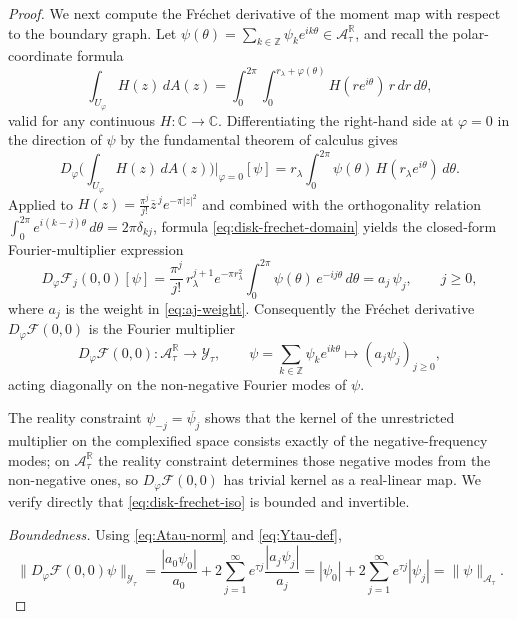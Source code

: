 \documentclass[a4paper,11pt,reqno]{amsart}
\numberwithin{equation}{section}
\theoremstyle{plain} %
\theoremstyle{definition} %
\theoremstyle{remark}
\newcommand{\R}{\mathbb{R}}
\newcommand{\C}{\mathbb{C}}
\newcommand{\Z}{\mathbb{Z}}
\begin{document}
\begin{proof}
We next compute the Fr\'echet derivative of the moment map with respect to
the boundary graph. Let
\(\psi(\theta)=\sum_{k\in\Z}\psi_k e^{ik\theta}\in\mathcal A_\tau^\R\), and
recall the polar-coordinate formula
\[
\int_{U_\varphi}H(z)\,dA(z)
=
\int_0^{2\pi}\!\!\int_0^{r_\lambda+\varphi(\theta)}
H(re^{i\theta})\,r\,dr\,d\theta,
\]
valid for any continuous \(H\colon\C\to\C\). Differentiating the right-hand
side at \(\varphi=0\) in the direction of \(\psi\) by the fundamental
theorem of calculus gives
\begin{equation}\label{eq:disk-frechet-domain}
D_\varphi\!\Big(\int_{U_\varphi}H(z)\,dA(z)\Big)\bigg|_{\varphi=0}\![\psi]
=
r_\lambda\!\int_0^{2\pi}\!\psi(\theta)\,H(r_\lambda e^{i\theta})\,d\theta .
\end{equation}
Applied to \(H(z)=\frac{\pi^j}{j!}\overline z^{\,j}e^{-\pi|z|^2}\) and combined
with the orthogonality relation
\(\int_0^{2\pi}e^{i(k-j)\theta}\,d\theta=2\pi\delta_{kj}\), formula
\eqref{eq:disk-frechet-domain} yields the closed-form Fourier-multiplier
expression
\begin{equation}\label{eq:disk-frechet-multiplier}
D_\varphi\mathcal F_j(0,0)[\psi]
=
\frac{\pi^j}{j!}\,r_\lambda^{j+1}e^{-\pi r_\lambda^2}
\int_0^{2\pi}\!\psi(\theta)\,e^{-ij\theta}\,d\theta
=
a_j\,\psi_j,
\qquad j\ge0,
\end{equation}
where \(a_j\) is the weight in \eqref{eq:aj-weight}. Consequently the
Fr\'echet derivative \(D_\varphi\mathcal F(0,0)\) is the Fourier multiplier
\begin{equation}\label{eq:disk-frechet-iso}
D_\varphi\mathcal F(0,0)\colon
\mathcal A_\tau^\R\longrightarrow\mathcal Y_\tau,
\qquad
\psi=\sum_{k\in\Z}\psi_k e^{ik\theta}\longmapsto(a_j\psi_j)_{j\ge0},
\end{equation}
acting diagonally on the non-negative Fourier modes of \(\psi\).

The reality constraint \(\psi_{-j}=\overline{\psi_j}\) shows that the kernel
of the unrestricted multiplier on the complexified space consists exactly of
the negative-frequency modes; on \(\mathcal A_\tau^\R\) the reality
constraint determines those negative modes from the non-negative ones, so
\(D_\varphi\mathcal F(0,0)\) has trivial kernel as a real-linear map. We
verify directly that \eqref{eq:disk-frechet-iso} is bounded and invertible.

\emph{Boundedness.} Using \eqref{eq:Atau-norm} and \eqref{eq:Ytau-def},
\[
\|D_\varphi\mathcal F(0,0)\psi\|_{\mathcal Y_\tau}
=
\frac{|a_0\psi_0|}{a_0}+2\sum_{j=1}^\infty e^{\tau j}\frac{|a_j\psi_j|}{a_j}
=
|\psi_0|+2\sum_{j=1}^\infty e^{\tau j}|\psi_j|
=
\|\psi\|_{\mathcal A_\tau}.
\]


\end{proof}
\end{document}
